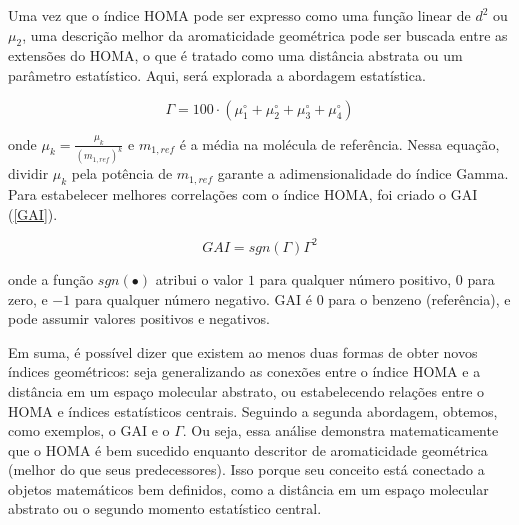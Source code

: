 Uma vez que o índice \gls{HOMA} pode ser expresso como uma função linear de $d^2$ ou $\mu_2$, uma descrição melhor da aromaticidade geométrica pode ser buscada entre as extensões do \gls{HOMA}, o que é tratado como uma distância abstrata ou um parâmetro estatístico. Aqui, será explorada a abordagem estatística.

\begin{equation}
    \Gamma = 100 \cdot (\mu_1^\circ + \mu_2^\circ + \mu_3^\circ + \mu_4^\circ)
\end{equation}

\noindent onde $\mu_k = \displaystyle \frac{\mu_k}{(m_{1, ref})^k}$ e $m_{1, ref}$ é a média na molécula de referência. Nessa equação, dividir $\mu_k$ pela potência de $m_{1, ref}$ garante a adimensionalidade do índice \gls{Gamma}. Para estabelecer melhores correlações com o índice \gls{HOMA}, foi criado o \gls{GAI} (\autoref{GAI}).

\begin{equation}
\label{GAI}
GAI = sgn(\Gamma) \Gamma^2
\end{equation}

\noindent onde a função $sgn (\bullet)$ atribui o valor $1$ para qualquer número positivo, $0$ para zero, e $-1$ para qualquer número negativo. \gls{GAI} é $0$ para o benzeno (referência), e pode assumir valores positivos e negativos.

Em suma, é possível dizer que existem ao menos duas formas de obter novos índices geométricos: seja generalizando as conexões entre o índice \gls{HOMA} e a distância em um espaço molecular abstrato, ou estabelecendo relações entre o \gls{HOMA} e índices estatísticos centrais. Seguindo a segunda abordagem, obtemos, como exemplos, o \gls{GAI} e o $\Gamma$. Ou seja, essa análise demonstra matematicamente que o \gls{HOMA} é bem sucedido enquanto descritor de aromaticidade geométrica (melhor do que seus predecessores). Isso porque seu conceito está conectado a objetos matemáticos bem definidos, como a distância em um espaço molecular abstrato ou o segundo momento estatístico central.